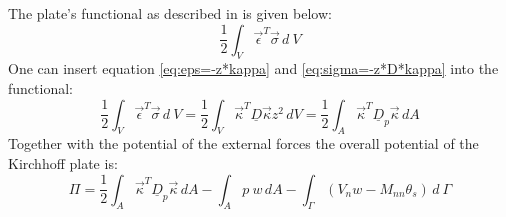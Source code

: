   The plate's functional as described in \cite{steinke2005finite} is given below:
  \begin{equation}
  \frac{1}{2} \int_V \vec{\epsilon}^T \vec{\sigma}\, d\:\!V
  \end{equation}
  One can insert equation \ref{eq:eps=-z*kappa} and \ref{eq:sigma=-z*D*kappa} into the functional:
  \begin{equation}
  \frac{1}{2} \int_V \vec{\epsilon}^T \vec{\sigma}\, d\:\!V = \frac{1}{2}\int_V \vec{\kappa}^T \underline{D} \vec{\kappa} z^2\, d\!V = \frac{1}{2} \int_A \vec{\kappa}^T \underline{D}_p \vec{\kappa}\, d\!A
  \end{equation}
  Together with the potential of the external forces the overall potential of the Kirchhoff plate is:
  \begin{equation}\label{eq:plateFunctional}
  \Pi = \frac{1}{2}\int_A \vec{\kappa}^T \underline{D}_p \vec{\kappa}\, dA
  - \int_A p\ w\, d\!A
  - \int_{\Gamma}\left(V_n w - M_{nn} \theta_s\right)\,d\:\!\Gamma
  \end{equation}
  
